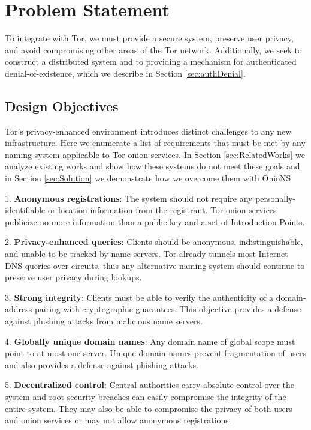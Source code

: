 \documentclass[USenglish,oneside,twocolumn]{article}
\begin{document}
\section{Problem Statement}
\label{sec:problemStatement}

To integrate with Tor, we must provide a secure system, preserve user privacy, and avoid compromising other areas of the Tor network. Additionally, we seek to construct a distributed system and to providing a mechanism for authenticated denial-of-existence, which we describe in Section \ref{sec:authDenial}.

\subsection{Design Objectives}

Tor's privacy-enhanced environment introduces distinct challenges to any new infrastructure. Here we enumerate a list of requirements that must be met by any naming system applicable to Tor onion services. In Section \ref{sec:RelatedWorks} we analyze existing works and show how these systems do not meet these goals and in Section \ref{sec:Solution} we demonstrate how we overcome them with OnioNS.

1. \textbf{Anonymous registrations}: The system should not require any personally-identifiable or location information from the registrant. Tor onion services publicize no more information than a public key and a set of Introduction Points.

2. \textbf{Privacy-enhanced queries}: Clients should be anonymous, indistinguishable, and unable to be tracked by name servers. Tor already tunnels most Internet DNS queries over circuits, thus any alternative naming system should continue to preserve user privacy during lookups.

3. \textbf{Strong integrity}: Clients must be able to verify the authenticity of a domain-address pairing with cryptographic guarantees. This objective provides a defense against phishing attacks from malicious name servers.

4. \textbf{Globally unique domain names}: Any domain name of global scope must point to at most one server.  Unique domain names prevent fragmentation of users and also provides a defense against phishing attacks.


5. \textbf{Decentralized control}: Central authorities carry absolute control over the system and root security breaches can easily compromise the integrity of the entire system. They may also be able to compromise the privacy of both users and onion services or may not allow anonymous registrations.
\end{document}
